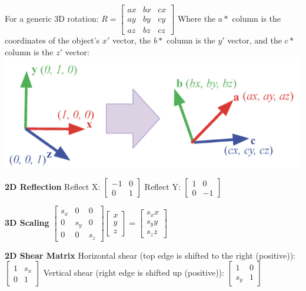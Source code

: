 \documentclass[letterpaper, 8pt]{extarticle}
\begin{document}
\begin{multicols*}{4}
For a generic 3D rotation:
\(
R =
\begin{bmatrix}
    ax & bx & cx \\
    ay & by & cy \\
    az & bz & cz
\end{bmatrix}
\)
Where the \(a*\) column is the coordinates of the object's \(x'\) vector,
the \(b*\) column is the \(y'\) vector,
and the \(c*\) column is the \(z'\) vector:
\includegraphics[width=\linewidth]{3d-rotation.png}

\textbf{2D Reflection}
Reflect X:\@
\(
\begin{bmatrix} -1 & 0 \\ 0 & 1 \end{bmatrix}
\)
Reflect Y:\@
\(
\begin{bmatrix} 1 & 0 \\ 0 & -1 \end{bmatrix}
\)

\textbf{3D Scaling}
\(
\begin{bmatrix}
    s_x & 0 & 0 \\
    0 & s_y & 0 \\
    0 & 0 & s_z
\end{bmatrix}
\begin{bmatrix}
    x \\ y \\ z
\end{bmatrix}
=
\begin{bmatrix}
    s_x x \\ s_y y \\ s_z z
\end{bmatrix}
\)

\textbf{2D Shear Matrix}
Horizontal shear (top edge is shifted to the right (positive)):
\(
\begin{bmatrix}
    1 & s_x \\
    0 & 1
\end{bmatrix}
\)
Vertical shear (right edge is shifted up (positive)):
\(
\begin{bmatrix}
    1 & 0 \\
    s_y & 1
\end{bmatrix}
\)


\end{multicols*}
\end{document}
